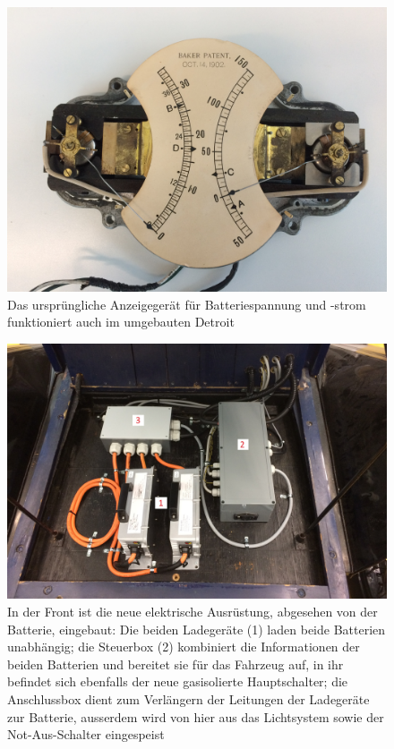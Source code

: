 \begin{landscape}
\begin{figure}[h]
		\includegraphics[width=1.30\textwidth]{images/Anhang/Volt_Ampere.jpg}
	\caption{Das ursprüngliche Anzeigegerät für Batteriespannung und -strom funktioniert auch im umgebauten Detroit}
	\label{fig:Volt_Ampere}
\end{figure}
\begin{figure}[h]
	\centering
		\includegraphics[width=1.30\textwidth]{images/Anhang/Front.jpg}
	\caption{In der Front ist die neue elektrische Ausrüstung, abgesehen von der Batterie, eingebaut: Die beiden Ladegeräte (1) laden beide Batterien unabhängig; die Steuerbox (2) kombiniert die Informationen der beiden Batterien und bereitet sie für das Fahrzeug auf, in ihr befindet sich ebenfalls der neue gasisolierte Hauptschalter; die Anschlussbox dient zum Verlängern der Leitungen der Ladegeräte zur Batterie, ausserdem wird von hier aus das Lichtsystem sowie der Not-Aus-Schalter eingespeist}
	\label{fig:Front}
\end{figure}
\newpage
	\end{landscape}

